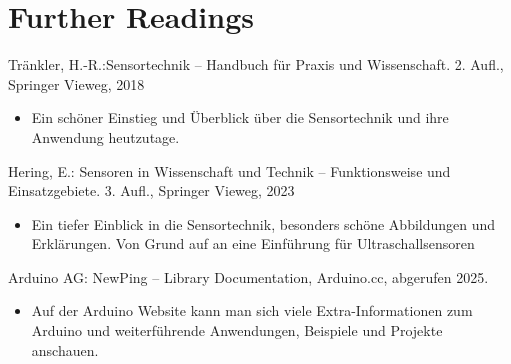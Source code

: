 \section{Further Readings}
		Tränkler, H.-R.:Sensortechnik – Handbuch für Praxis und Wissenschaft. 2. Aufl., Springer Vieweg, 2018 \cite{Traenkler:2018}
		\begin{itemize}
			\item Ein schöner Einstieg und Überblick über die Sensortechnik und ihre Anwendung heutzutage.
		\end{itemize} 

		Hering, E.: Sensoren in Wissenschaft und Technik – Funktionsweise und Einsatzgebiete. 3. Aufl., Springer Vieweg, 2023 \cite{Hering:2023}
		\begin{itemize}
			\item Ein tiefer Einblick in die Sensortechnik, besonders schöne Abbildungen und Erklärungen. Von Grund auf an eine Einführung für Ultraschallsensoren
		\end{itemize} 

		Arduino AG: NewPing – Library Documentation, Arduino.cc, abgerufen 2025. \cite{ArduinoDoc:2024}
		\begin{itemize}
			\item 	Auf der Arduino Website kann man sich viele Extra-Informationen zum Arduino und weiterführende Anwendungen, Beispiele und Projekte anschauen.
		\end{itemize}






